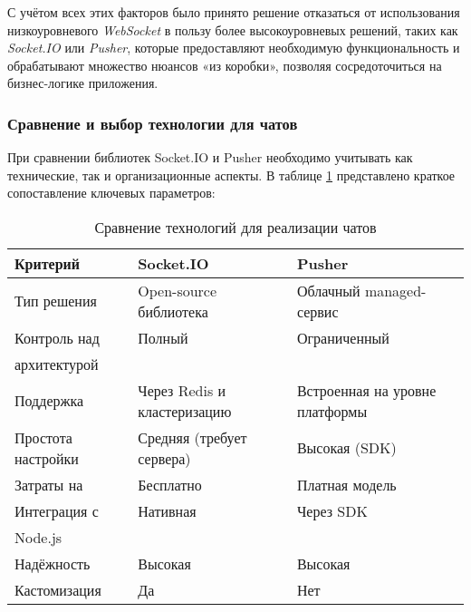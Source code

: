 С учётом всех этих факторов было принято решение отказаться от использования низкоуровневого \textit{WebSocket} в пользу более высокоуровневых решений, таких как \textit{Socket.IO} или \textit{Pusher}, которые предоставляют необходимую функциональность и обрабатывают множество нюансов «из коробки», позволяя сосредоточиться на бизнес-логике приложения.


\subsubsection*{Сравнение и выбор технологии для чатов}

При сравнении библиотек Socket.IO и Pusher необходимо учитывать как технические, так и организационные аспекты. В таблице \ref{tab:chat-comparison} представлено краткое сопоставление ключевых параметров:

\begin{table}[h]
  \centering
  \caption{Сравнение технологий для реализации чатов}
  \small
  \label{tab:chat-comparison}
  \begin{tabular}{|l|p{5cm}|p{5cm}|}
    \hline
    \textbf{Критерий} & \textbf{Socket.IO}               & \textbf{Pusher}                 \\ \hline
    Тип решения      & Open-source библиотека           & Облачный managed-сервис         \\ \hline
    Контроль над     & Полный                           & Ограниченный                    \\ 
    архитектурой     &                                  &                                 \\ \hline
    Поддержка        & Через Redis и кластеризацию      & Встроенная на уровне платформы  \\ \hline
    Простота настройки & Средняя (требует сервера)      & Высокая (SDK)                   \\ \hline
    Затраты на       & Бесплатно                        & Платная модель                  \\ \hline
    Интеграция с     & Нативная                         & Через SDK                       \\ 
    Node.js          &                                  &                                 \\ \hline
    Надёжность       & Высокая                          & Высокая                         \\ \hline
    Кастомизация     & Да                               & Нет                             \\ \hline
  \end{tabular}
\end{table}

